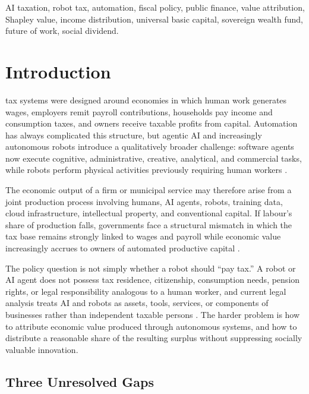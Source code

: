 \documentclass[journal]{IEEEtran}
\theoremstyle{plain}
\theoremstyle{definition}
\begin{document}
\begin{IEEEkeywords}
AI taxation, robot tax, automation, fiscal policy, public finance, value attribution, Shapley value, income distribution, universal basic capital, sovereign wealth fund, future of work, social dividend.
\end{IEEEkeywords}

\IEEEpeerreviewmaketitle

\section{Introduction}

 tax systems were designed around economies in which human work generates wages, employers remit payroll contributions, households pay income and consumption taxes, and owners receive taxable profits from capital. Automation has always complicated this structure, but agentic AI and increasingly autonomous robots introduce a qualitatively broader challenge: software agents now execute cognitive, administrative, creative, analytical, and commercial tasks, while robots perform physical activities previously requiring human workers \cite{AcemogluRestrepo2019,BrynjolfssonMitchellRock2018,Eloundou2023}.

The economic output of a firm or municipal service may therefore arise from a joint production process involving humans, AI agents, robots, training data, cloud infrastructure, intellectual property, and conventional capital. If labour's share of production falls, governments face a structural mismatch in which the tax base remains strongly linked to wages and payroll while economic value increasingly accrues to owners of automated productive capital \cite{IMF2024Fiscal,Korinek2026}.

The policy question is not simply whether a robot should ``pay tax.'' A robot or AI agent does not possess tax residence, citizenship, consumption needs, pension rights, or legal responsibility analogous to a human worker, and current legal analysis treats AI and robots as assets, tools, services, or components of businesses rather than independent taxable persons \cite{DimitropoulouAIIncome}. The harder problem is how to attribute economic value produced through autonomous systems, and how to distribute a reasonable share of the resulting surplus without suppressing socially valuable innovation.

\subsection{Three Unresolved Gaps}
\end{document}

